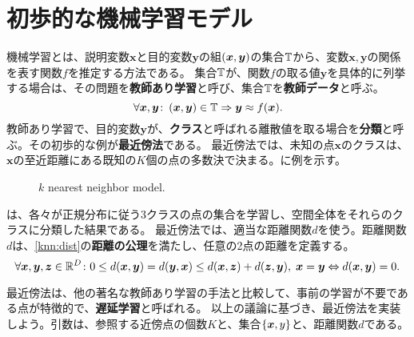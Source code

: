 \documentclass[10pt,a4paper]{book}
\begin{document}
\maketitle
\tableofcontents

\chapter{初歩的な機械学習モデル\label{chap:intro}}

機械学習とは、説明変数$\bm{x}$と目的変数$\bm{y}$の組$\XY$の集合$\mathbb{T}$から、変数$\bm{x},\bm{y}$の関係を表す関数$f$を推定する方法である。
集合$\mathbb{T}$が、関数$f$の取る値$\bm{y}$を具体的に列挙する場合は、その問題を\textbf{教師あり学習}と呼び、集合$\mathbb{T}$を\textbf{教師データ}と呼ぶ。
%
\begin{equation}
\forall\bm{x},\bm{y}\colon \pair{\bm{x}}{\bm{y}}\in\TRAIN \Rightarrow \bm{y} \approx f(\bm{x}).
\end{equation}
%
教師あり学習で、目的変数$\bm{y}$が、\textbf{クラス}と呼ばれる離散値を取る場合を\textbf{分類}と呼ぶ。その初歩的な例が\textbf{最近傍法}である。
最近傍法では、未知の点$\bm{x}$のクラスは、$\bm{x}$の至近距離にある既知の$K$個の点の多数決で決まる。に例を示す。

\begin{figure}[h]
\centering
{}
\caption{$k$ nearest neighbor model.\label{fig:knn}}
\end{figure}

は、各々が正規分布に従う3クラスの点の集合を学習し、空間全体をそれらのクラスに分類した結果である。
最近傍法では、適当な距離関数$d$を使う。距離関数$d$は、\eqref{knn:dist}の\textbf{距離の公理}を満たし、任意の2点の距離を定義する。
%
\begin{equation}
\label{eq:knn:dist}
\forall \bm{x},\bm{y},\bm{z} \in \mathbb{R}^D \colon
0 \leq d(\bm{x},\bm{y}) = d(\bm{y},\bm{x}) \leq d(\bm{x},\bm{z}) + d(\bm{z},\bm{y}),\;
\bm{x} = \bm{y} \Leftrightarrow d(\bm{x},\bm{y}) = 0.
\end{equation}

最近傍法は、他の著名な教師あり学習の手法と比較して、事前の学習が不要である点が特徴的で、\textbf{遅延学習}と呼ばれる。
以上の議論に基づき、最近傍法を実装しよう。引数は、参照する近傍点の個数$K$と、集合$\seq{\bm{x},y}$と、距離関数$d$である。
\end{document}
